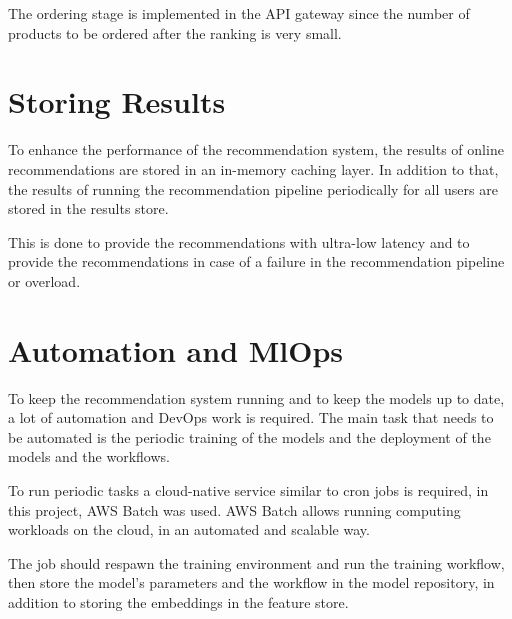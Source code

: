 The ordering stage is implemented in the API gateway since the number of products to be ordered after the ranking is very small.


\section{Storing Results}

To enhance the performance of the recommendation system, the results of online recommendations are stored in an in-memory caching layer.
In addition to that, the results of running the recommendation pipeline periodically for all users are stored in the results store.

This is done to provide the recommendations with ultra-low latency and to provide the recommendations in case of a failure in the recommendation pipeline or overload.

\section{Automation and MlOps}

To keep the recommendation system running and to keep the models up to date, a lot of automation and DevOps work is required.
The main task that needs to be automated is the periodic training of the models and the deployment of the models and the workflows.

To run periodic tasks a cloud-native service similar to cron jobs is required, in this project, AWS Batch \cite{AwsBatch} was used.
AWS Batch allows running computing workloads on the cloud, in an automated and scalable way.

The job should respawn the training environment and run the training workflow, then store the model's parameters and the workflow in the model repository, in addition to storing the embeddings in the feature store.

